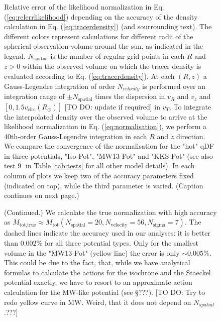 

\begin{figure}
\caption{Relative error of the likelihood normalization in Eq. (\ref{eq:relerrlikelihood}) depending on the accuracy of the density calculation in Eq. (\ref{eq:tracerdensity}) (and sourrounding text). The different colors represent calculations for different radii of the spherical observation volume around the sun, as indicated in the legend. $N_\text{spatial}$ is the number of regular grid points in each $R$ and $z > 0$ within the observed volume on which the tracer density is evaluated according to Eq. (\ref{eq:tracerdensity}). At each $(R,z)$ a Gauss-Legendre integration of order $N_{velocity}$ is performed over an integration range of $\pm N_\text{spatial}$ times the dispersion in $v_R$ and $v_z$ and $[0,1.5v_\text{circ}(R_\odot)]$ [TO DO: update if required] in $v_T$. To integrate the interpolated density over the observed volume to arrive at the likelihood normalization in Eq. (\ref{eq:normalisation}), we perform a 40th-order Gauss-Legendre integration in each $R$ and $z$ direction. We compare the convergence of the normalisation for the "hot" qDF in three potentials, "Iso-Pot", "MW13-Pot" and "KKS-Pot" (see also test \textcircled{9} in Table \ref{tab:tests} for all other model details). In each column of plots we keep two of the accuracy parameters fixed (indicated on top), while the third parameter is varied. (Caption continues on next page.)} 
\label{fig:norm_accuracy}
\end{figure}

\addtocounter{figure}{-1}
\begin{figure} [t!]
  \caption{(Continued.) We calculate the true normalization with high accuracy as $M_\text{tot,true} \approx M_\text{tot}(N_\text{spatial}=20,N_\text{velocity}=56,N_\text{sigma}=7)$. The dashed lines indicate the accuracy used in our analyses: it is better than $0.002\%$ for all three potential types. Only for the smallest volume in the "MW13-Pot" (yellow line) the error is only $\sim 0.005\%$. This could be due to the fact, that, while we have analytical formulas to calculate the actions for the isochrone and the Staeckel potential exactly, we have to resort to an approximate action calculation for the MW-like potential (see \S ???). [TO DO: Try to redo yellow curve in MW. Weird, that it does not depend on $N_{spatial}$.???]}
\end{figure}


